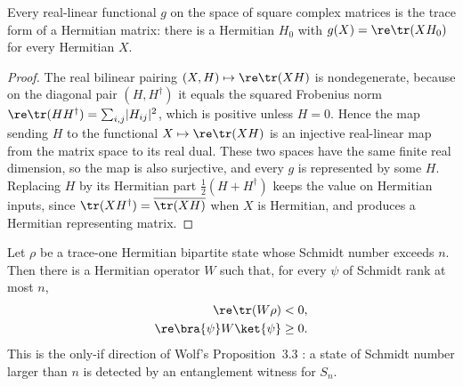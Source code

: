 \begin{theorem}
    \label{thm:exists_isHermitian_trace_form_re}
    \leanok
    Every real-linear functional $g$ on the space of square complex matrices is the
    trace form of a Hermitian matrix: there is a Hermitian $H_0$ with
    $g(X)=\re\tr(X H_0)$ for every Hermitian $X$.
\end{theorem}

\begin{proof}
    \leanok
    The real bilinear pairing $(X,H)\mapsto\re\tr(X H)$ is nondegenerate,
    because on the diagonal pair $(H,H^{\dagger})$ it equals the squared Frobenius norm
    $\re\tr(H H^{\dagger})=\sum_{i,j}\lvert H_{ij}\rvert^2$, which is positive
    unless $H=0$. Hence the map sending $H$ to the functional
    $X\mapsto\re\tr(X H)$ is an injective real-linear map from the matrix
    space to its real dual. These two spaces have the same finite real dimension, so the
    map is also surjective, and every $g$ is represented by some $H$. Replacing $H$ by
    its Hermitian part $\tfrac12(H+H^{\dagger})$ keeps the value on Hermitian inputs,
    since $\tr(X H^{\dagger})=\overline{\tr(X H)}$ when $X$ is Hermitian, and produces a
    Hermitian representing matrix.
\end{proof}

\begin{theorem}
    \label{thm:exists_entanglement_witness}
    \leanok
    Let $\rho$ be a trace-one Hermitian bipartite state whose Schmidt number exceeds $n$.
    Then there is a Hermitian operator $W$ such that, for every $\psi$ of Schmidt rank
    at most $n$,
    \begin{align}
        \re\tr(W\rho)            & <0,
        \notag                            \\
        \re\bra{\psi}W\ket{\psi} & \ge 0.
        \notag
    \end{align}
    This is the only-if direction of Wolf's Proposition~3.3
    \cite[Chapter~3, Proposition~3.3]{Wolf2012Quantum}: a state of Schmidt number larger
    than $n$ is detected by an entanglement witness for $S_n$.
\end{theorem}

